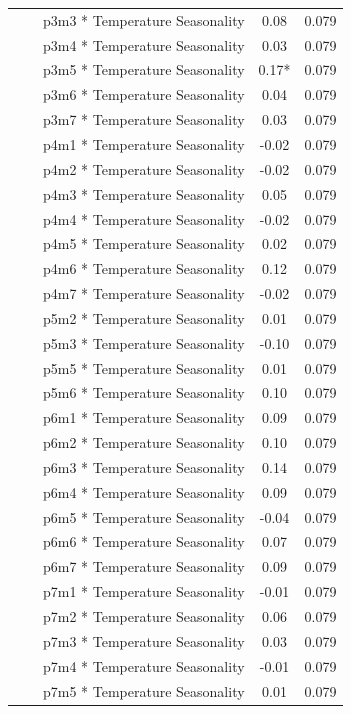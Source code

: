\documentclass[
]{agujournal2019}
\begin{document}
\begin{longtable*}{lcc}
    p3m3 * Temperature Seasonality & 0.08 & 0.079 \\ 
    p3m4 * Temperature Seasonality & 0.03 & 0.079 \\ 
    p3m5 * Temperature Seasonality & 0.17* & 0.079 \\ 
    p3m6 * Temperature Seasonality & 0.04 & 0.079 \\ 
    p3m7 * Temperature Seasonality & 0.03 & 0.079 \\ 
    p4m1 * Temperature Seasonality & -0.02 & 0.079 \\ 
    p4m2 * Temperature Seasonality & -0.02 & 0.079 \\ 
    p4m3 * Temperature Seasonality & 0.05 & 0.079 \\ 
    p4m4 * Temperature Seasonality & -0.02 & 0.079 \\ 
    p4m5 * Temperature Seasonality & 0.02 & 0.079 \\ 
    p4m6 * Temperature Seasonality & 0.12 & 0.079 \\ 
    p4m7 * Temperature Seasonality & -0.02 & 0.079 \\ 
    p5m2 * Temperature Seasonality & 0.01 & 0.079 \\ 
    p5m3 * Temperature Seasonality & -0.10 & 0.079 \\ 
    p5m5 * Temperature Seasonality & 0.01 & 0.079 \\ 
    p5m6 * Temperature Seasonality & 0.10 & 0.079 \\ 
    p6m1 * Temperature Seasonality & 0.09 & 0.079 \\ 
    p6m2 * Temperature Seasonality & 0.10 & 0.079 \\ 
    p6m3 * Temperature Seasonality & 0.14 & 0.079 \\ 
    p6m4 * Temperature Seasonality & 0.09 & 0.079 \\ 
    p6m5 * Temperature Seasonality & -0.04 & 0.079 \\ 
    p6m6 * Temperature Seasonality & 0.07 & 0.079 \\ 
    p6m7 * Temperature Seasonality & 0.09 & 0.079 \\ 
    p7m1 * Temperature Seasonality & -0.01 & 0.079 \\ 
    p7m2 * Temperature Seasonality & 0.06 & 0.079 \\ 
    p7m3 * Temperature Seasonality & 0.03 & 0.079 \\ 
    p7m4 * Temperature Seasonality & -0.01 & 0.079 \\ 
    p7m5 * Temperature Seasonality & 0.01 & 0.079 \\ 

\end{longtable*}
\end{document}
